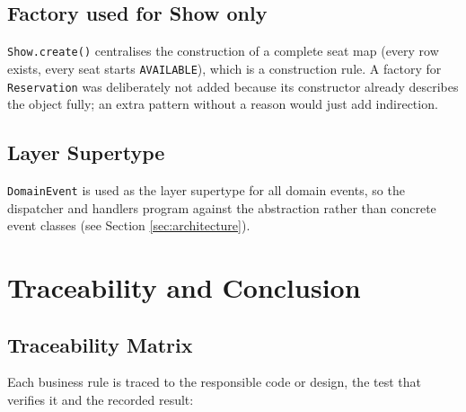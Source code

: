 \documentclass[11pt,a4paper]{article}
\newcommand{\code}[1]{\texttt{#1}}
\begin{document}
\subsection{Factory used for Show only}

\code{Show.create()} centralises the construction of a complete seat map
(every row exists, every seat starts \code{AVAILABLE}), which is a construction
rule. A factory for \code{Reservation} was deliberately not added because its
constructor already describes the object fully; an extra pattern without a
reason would just add indirection.

\subsection{Layer Supertype}

\code{DomainEvent} is used as the layer supertype for all domain events, so the
dispatcher and handlers program against the abstraction rather than concrete
event classes (see Section \ref{sec:architecture}).

\section{Traceability and Conclusion}

\subsection{Traceability Matrix}

Each business rule is traced to the responsible code or design, the test that
verifies it and the recorded result:
\end{document}
